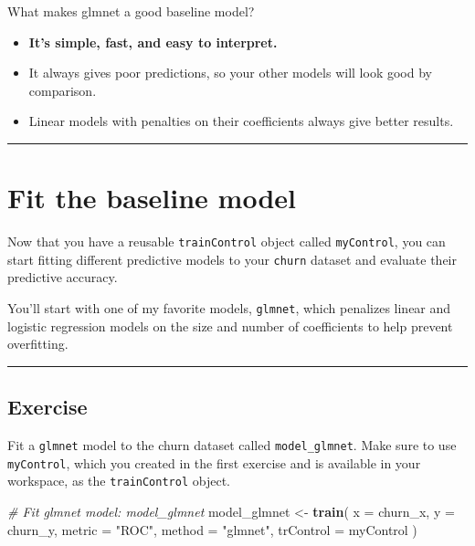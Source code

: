 \documentclass[
]{book}
\newenvironment{Shaded}{\begin{snugshade}}{\end{snugshade}}
\newcommand{\CommentTok}[1]{\textcolor[rgb]{0.56,0.35,0.01}{\textit{#1}}}
\newcommand{\DataTypeTok}[1]{\textcolor[rgb]{0.13,0.29,0.53}{#1}}
\newcommand{\KeywordTok}[1]{\textcolor[rgb]{0.13,0.29,0.53}{\textbf{#1}}}
\newcommand{\NormalTok}[1]{#1}
\newcommand{\StringTok}[1]{\textcolor[rgb]{0.31,0.60,0.02}{#1}}
\begin{document}
What makes glmnet a good baseline model?

\begin{itemize}
\item
  \textbf{It's simple, fast, and easy to interpret.}
\item
  It always gives poor predictions, so your other models will look good by comparison.
\item
  Linear models with penalties on their coefficients always give better results.
\end{itemize}

\begin{center}\rule{0.5\linewidth}{0.5pt}\end{center}

\hypertarget{fit-the-baseline-model}{%
\section{Fit the baseline model}\label{fit-the-baseline-model}}

Now that you have a reusable \texttt{trainControl} object called \texttt{myControl}, you can start fitting different predictive models to your \texttt{churn} dataset and evaluate their predictive accuracy.

You'll start with one of my favorite models, \texttt{glmnet}, which penalizes linear and logistic regression models on the size and number of coefficients to help prevent overfitting.

\begin{center}\rule{0.5\linewidth}{0.5pt}\end{center}

\hypertarget{exercise-30}{%
\subsection*{Exercise}\label{exercise-30}}

Fit a \texttt{glmnet} model to the churn dataset called \texttt{model\_glmnet}. Make sure to use \texttt{myControl}, which you created in the first exercise and is available in your workspace, as the \texttt{trainControl} object.

\begin{Shaded}
\begin{Highlighting}[]
\CommentTok{# Fit glmnet model: model_glmnet}
\NormalTok{model_glmnet <-}\StringTok{ }\KeywordTok{train}\NormalTok{(}
  \DataTypeTok{x =}\NormalTok{ churn_x, }\DataTypeTok{y =}\NormalTok{ churn_y,}
  \DataTypeTok{metric =} \StringTok{"ROC"}\NormalTok{,}
  \DataTypeTok{method =} \StringTok{"glmnet"}\NormalTok{,}
  \DataTypeTok{trControl =}\NormalTok{ myControl}
\NormalTok{)}
\end{Highlighting}
\end{Shaded}
\end{document}
